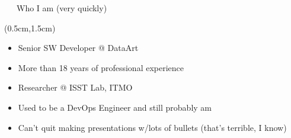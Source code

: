 \documentclass[xetex,18pt,aspectratio=43]{beamer}
\begin{document}
\begin{Large}
\begin{frame}{\ \ \ Who I am (very quickly)}
\begin{textblock*}{\framewidth-0.8cm}(0.5cm,1.5cm) %
\begin{itemize}
  \item Senior SW Developer @ DataArt
  \item More than 18 years of professional experience
  \item Researcher @ ISST Lab, ITMO
  \item Used to be a DevOps Engineer and still probably am
  \item Can't quit making presentations w/lots of bullets (that's terrible, I know)
\end{itemize}
\end{textblock*}
\end{frame}






\end{Large}
\end{document}
